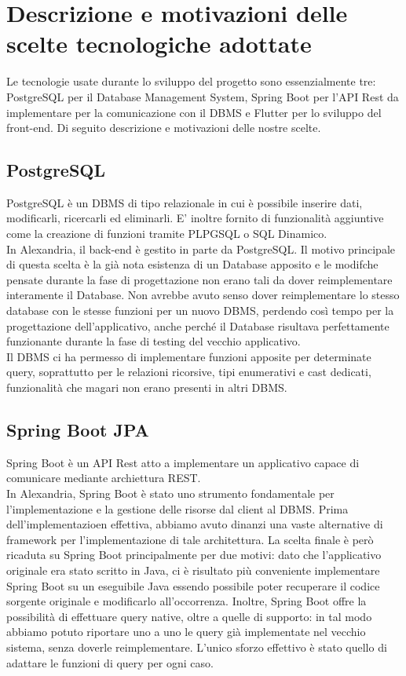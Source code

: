 \raggedright{\section{Descrizione e motivazioni delle scelte tecnologiche adottate}
Le tecnologie usate durante lo sviluppo del progetto sono essenzialmente tre: PostgreSQL per il Database Management System, Spring Boot per l'API Rest da implementare per la comunicazione con il DBMS e Flutter per lo sviluppo del front-end. Di seguito descrizione e motivazioni delle nostre scelte.

\raggedright{\subsection{PostgreSQL}}
PostgreSQL è un \gls{DBMS} di tipo relazionale in cui è possibile inserire dati, modificarli,  ricercarli ed eliminarli. E' inoltre fornito di funzionalità aggiuntive come la creazione di funzioni tramite PLPGSQL o SQL Dinamico. \\
In Alexandria, il back-end è gestito in parte da PostgreSQL. Il motivo principale di questa scelta è la già nota esistenza di un Database apposito e le modifche pensate durante la fase di progettazione non erano tali da dover reimplementare interamente il Database. Non avrebbe avuto senso dover reimplementare lo stesso database con le stesse funzioni per un nuovo DBMS, perdendo così tempo per la progettazione dell'applicativo, anche perché il Database risultava perfettamente funzionante durante la fase di testing del vecchio applicativo. \\
Il DBMS ci ha permesso di implementare funzioni apposite per determinate query, soprattutto per le relazioni ricorsive, tipi enumerativi e cast dedicati, funzionalità che magari non erano presenti in altri DBMS. \newpage
\raggedright{\subsection{Spring Boot JPA}}
\gls{Spring Boot} è un API Rest atto a implementare un applicativo capace di comunicare mediante archiettura REST. \\
In Alexandria, Spring Boot è stato uno strumento fondamentale per l'implementazione e la gestione delle risorse dal client al DBMS. Prima dell'implementazioen effettiva, abbiamo avuto dinanzi una vaste alternative di framework per l'implementazione di tale architettura. La scelta finale è però ricaduta su Spring Boot principalmente per due motivi: dato che l'applicativo originale era stato scritto in Java, ci è risultato più conveniente implementare Spring Boot su un eseguibile Java essendo possibile poter recuperare il codice sorgente originale e modificarlo all'occorrenza. Inoltre, Spring Boot offre la possibilità di effettuare query native, oltre a quelle di supporto: in tal modo abbiamo potuto riportare uno a uno le query già implementate nel vecchio sistema, senza doverle reimplementare. L'unico sforzo effettivo è stato quello di adattare le funzioni di query per ogni caso.  \\
}
